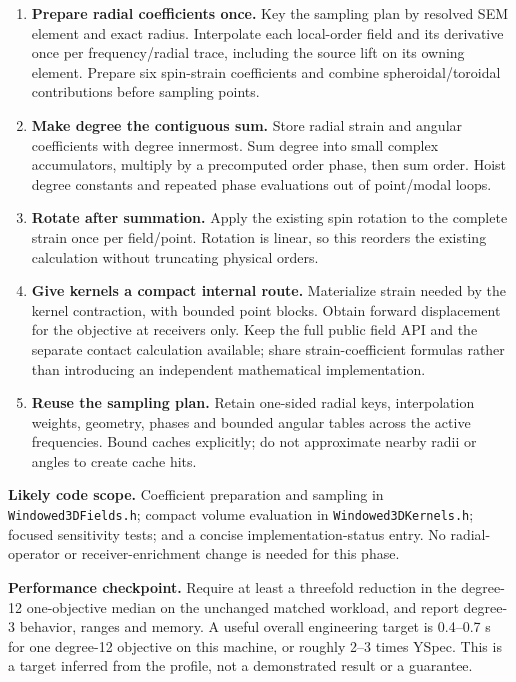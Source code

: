 \documentclass[11pt,a4paper]{article}
\begin{document}
\begin{enumerate}[leftmargin=1.5em,itemsep=6pt]
\item \textbf{Prepare radial coefficients once.} Key the sampling plan by resolved SEM element and exact radius. Interpolate each local-order field and its derivative once per frequency/radial trace, including the source lift on its owning element. Prepare six spin-strain coefficients and combine spheroidal/toroidal contributions before sampling points.
\item \textbf{Make degree the contiguous sum.} Store radial strain and angular coefficients with degree innermost. Sum degree into small complex accumulators, multiply by a precomputed order phase, then sum order. Hoist degree constants and repeated phase evaluations out of point/modal loops.
\item \textbf{Rotate after summation.} Apply the existing spin rotation to the complete strain once per field/point. Rotation is linear, so this reorders the existing calculation without truncating physical orders.
\item \textbf{Give kernels a compact internal route.} Materialize strain needed by the kernel contraction, with bounded point blocks. Obtain forward displacement for the objective at receivers only. Keep the full public field API and the separate contact calculation available; share strain-coefficient formulas rather than introducing an independent mathematical implementation.
\item \textbf{Reuse the sampling plan.} Retain one-sided radial keys, interpolation weights, geometry, phases and bounded angular tables across the active frequencies. Bound caches explicitly; do not approximate nearby radii or angles to create cache hits.
\end{enumerate}

\textbf{Likely code scope.} Coefficient preparation and sampling in \texttt{Windowed3DFields.h}; compact volume evaluation in \texttt{Windowed3DKernels.h}; focused sensitivity tests; and a concise implementation-status entry. No radial-operator or receiver-enrichment change is needed for this phase.

\textbf{Performance checkpoint.} Require at least a threefold reduction in the degree-12 one-objective median on the unchanged matched workload, and report degree-3 behavior, ranges and memory. A useful overall engineering target is 0.4--0.7 s for one degree-12 objective on this machine, or roughly 2--3 times YSpec. This is a target inferred from the profile, not a demonstrated result or a guarantee.
\end{document}
